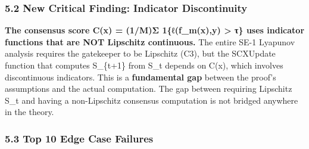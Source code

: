 \documentclass[
  12pt,
]{ctexart}
\begin{document}
\subsubsection{5.2 New Critical Finding: Indicator
Discontinuity}\label{new-critical-finding-indicator-discontinuity}

\textbf{The consensus score C(x) = (1/M)Σ 1\{ℓ(f\_m(x),y) \textgreater{}
τ\} uses indicator functions that are NOT Lipschitz continuous.} The
entire SE-1 Lyapunov analysis requires the gatekeeper to be Lipschitz
(C3), but the SCXUpdate function that computes S\_\{t+1\} from S\_t
depends on C(x), which involves discontinuous indicators. This is a
\textbf{fundamental gap} between the proof's assumptions and the actual
computation. The gap between requiring Lipschitz S\_t and having a
non-Lipschitz consensus computation is not bridged anywhere in the
theory.

\subsubsection{5.3 Top 10 Edge Case
Failures}\label{top-10-edge-case-failures}
\end{document}
